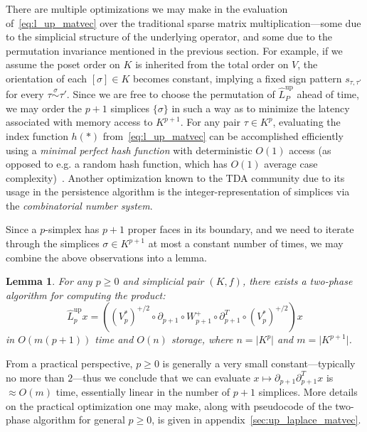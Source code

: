 \documentclass[12pt]{article}
\numberwithin{equation}{section}
\newcommand{\+}{%
	\raisebox{0.18ex}{\scaleobj{0.55}{+}}
}
\newtheorem{lemma}{Lemma}
\theoremstyle{definition}
\begin{document}
There are multiple optimizations we may make in the evaluation of~\eqref{eq:l_up_matvec} over the traditional sparse matrix multiplication---some due to the simplicial structure of the underlying operator, and some due to the permutation invariance mentioned in the previous section. 
For example, if we assume the poset order on $K$ is inherited from the total order on $V$, the orientation of each $[\sigma] \in K$ becomes constant, implying a fixed sign pattern $s_{\tau, \tau'}$ for every $\tau \overset{\sigma}{\sim} \tau'$. 
Since we are free to choose the permutation of $\hat{L}_P^{\text{up}}$ ahead of time, we may order the $p+1$ simplices $\{\sigma\}$ in such a way as to minimize the latency associated with memory access to $K^{p+1}$.
For any pair $\tau \in K^p$, evaluating the index function $h(\ast)$ from~\eqref{eq:l_up_matvec} can be accomplished efficiently using a \emph{minimal perfect hash function} with deterministic $O(1)$ access (as opposed to e.g. a random hash function, which has $O(1)$ average case complexity)~\cite{}. 
Another optimization known to the TDA community due to its usage in the persistence algorithm is the integer-representation of simplices via the \emph{combinatorial number system}. 

Since a $p$-simplex has $p+1$ proper faces in its boundary, and we need to iterate through the simplices $\sigma \in K^{p+1}$ at most a constant number of times, we may combine the above observations into a lemma. 
\begin{lemma}
	For any $p \geq 0$ and simplicial pair $(K, f)$, there exists a two-phase algorithm for computing the product: 
	\begin{equation}
		\hat{L}_p^{\textrm{up}} x = ((V_p^\ast)^{+/2} \circ \partial_{p+1} \circ W_{p+1}^+ \circ \partial_{p+1}^T \circ (V_p^\ast)^{+/2})x
	\end{equation}
	in $O(m(p+1))$ time and $O(n)$ storage, where $n = \lvert K^p \rvert$ and $m = \lvert K^{p+1} \rvert$. 
\end{lemma}
\noindent From a practical perspective, $p \geq 0$ is generally a very small constant---typically no more than $2$---thus we conclude that we can evaluate $x \mapsto \partial_{p+1} \partial_{p+1}^T x$ is $\approx O(m)$ time, essentially linear in the number of $p+1$ simplices. 
More details on the practical optimization one may make, along with pseudocode of the two-phase algorithm for general $p \geq 0$, is given in appendix~\ref{sec:up_laplace_matvec}.
\end{document}
